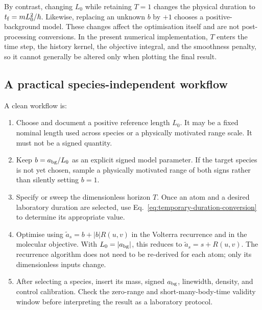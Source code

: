 \documentclass[9pt,a4paper,twocolumn,twoside]{rho-class/rho}
\begin{document}
        By contrast, changing $L_0$ while retaining $T=1$ changes the physical
        duration to $t_{\rm f}=mL_0^2/\hbar$.  Likewise, replacing an unknown
        $b$ by $+1$ chooses a positive-background model.  These changes affect
        the optimisation itself and are not post-processing conversions.  In
        the present numerical implementation, $T$ enters the time step, the
        history kernel, the objective integral, and the smoothness penalty, so
        it cannot generally be altered only when plotting the final result.

    \subsection{A practical species-independent workflow}

        A clean workflow is:
        \begin{enumerate}
            \item Choose and document a positive reference length $L_0$.  It
            may be a fixed nominal length used across species or a physically
            motivated range scale.  It must not be a signed quantity.
            \item Keep $b=a_{\rm bg}/L_0$ as an explicit signed model
            parameter.  If the target species is not yet chosen, sample a
            physically motivated range of both signs rather than silently
            setting $b=1$.
            \item Specify or sweep the dimensionless horizon $T$.  Once an atom
            and a desired laboratory duration are selected, use
            Eq.~\eqref{eq:temporary-duration-conversion} to determine its
            appropriate value.
            \item Optimise using
            $\widetilde a_s=b+|b|R(u,v)$ in the Volterra recurrence and in the
            molecular objective.  With $L_0=|a_{\rm bg}|$, this reduces to
            $\widetilde a_s=s+R(u,v)$.  The recurrence algorithm does not need
            to be re-derived for each atom; only its dimensionless inputs
            change.
            \item After selecting a species, insert its mass, signed
            $a_{\rm bg}$, linewidth, density, and control calibration.  Check
            the zero-range and short-many-body-time validity window before
            interpreting the result as a laboratory protocol.
        \end{enumerate}
\end{document}
